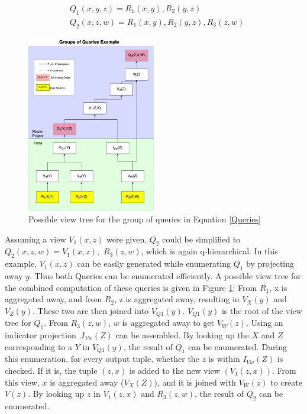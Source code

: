 \documentclass[abstracton,12pt]{scrreprt}
\begin{document}
\begin{equation}
\begin{split}\label{Queries}
	&Q_1(x,y,z) = R_1(x,y), R_2(y,z)	\\
	&Q_2(x,z,w) = R_1(x,y), R_2(y,z), R_3(z,w)
\end{split}
\end{equation}
\begin{figure}
	\centering
	\includegraphics[width=0.5\textwidth]{GroupsOfQueriesDiag}
	\caption{Possible view tree for the group of queries in Equation \ref{Queries}}
	\label{fig:ViewTree}
\end{figure}

Assuming a view $V_1(x,z)$ were given, $Q_2$ could be simplified to $Q_2(x,z,w) = V_1(x,z),$ $ R_3(z,w)$, which is again q-hierarchical. In this example, $V_1(x,z)$ can be easily generated while enumerating $Q_1$ by projecting away $y$. Thus both Queries can be enumerated efficiently. A possible view tree for the combined computation of these queries is given in Figure \ref{fig:ViewTree}: From $R_1$, x is aggregated away, and from $R_2$, z is aggregated away, resulting in $V_X(y)$ and $V_Z(y)$. These two are then joined into $V_{Q1}(y)$.  $V_{Q1}(y)$ is the root of the view tree for $Q_1$.  From $R_3(z,w)$, $w$ is aggregated away to get $V_W(z)$. Using an indicator projection ,$I_{Vw}(Z)$ can be assembled.  By looking up the $X$ and $Z$ corresponding to a $Y$ in  $V_{Q1}(y)$, the result of $Q_1$ can be enumerated. During this enumeration, for every output tuple, whether the $z$ is within $I_{Vw}(Z)$ is checked. If it is, the tuple $(z,x)$ is added to the new view $(V_1(z,x))$. From this view, $x$ is aggregated away ($V_X(Z)$), and it is joined with $V_W(z)$ to create $V(z)$. By looking up $z$ in $V_1(z,x)$ and $R_3(z,w)$, the result of $Q_2$ can be enumerated.
\end{document}
